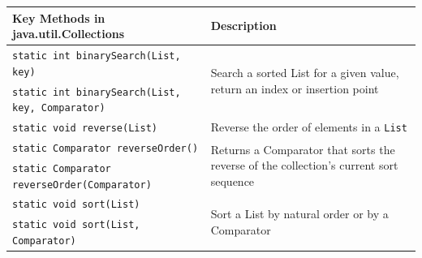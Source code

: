 \begin{center}
\begin{tabular}{lp{}}
    \textbf{Key Methods in java.util.Collections} & \textbf{Description} \\
    \hline
    \verb#static int binarySearch(List, key)# & 
    \multirow{2}{0.4\textwidth}{Search a sorted List for a given value, return 
    an index or insertion point} \\
    \verb#static int binarySearch(List, key, Comparator)# & \\
    \hline
    \verb#static void reverse(List)# & Reverse the order of elements in a 
    \verb#List# \\
    \hline
    \verb#static Comparator reverseOrder()# & 
    \multirow{2}{0.4\textwidth}{Returns a Comparator that sorts the reverse of 
    the collection's current sort sequence} \\
    \verb#static Comparator reverseOrder(Comparator)# & \\
    \hline
    \verb#static void sort(List)# & \multirow{2}{0.4\textwidth}{Sort a List by 
    natural order or by a Comparator} \\
    \verb#static void sort(List, Comparator)# & \\
\end{tabular}
\end{center}

